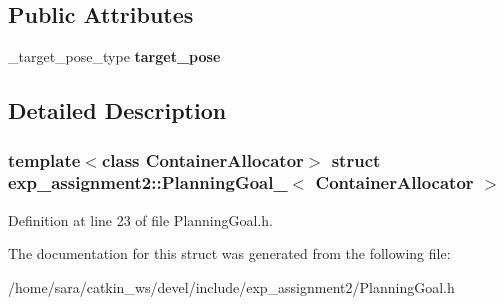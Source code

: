 \subsection*{Public Attributes}
\begin{DoxyCompactItemize}
\item 
\mbox{\label{structexp__assignment2_1_1PlanningGoal___a3468df99cf74378d36a10428537d37a0}} 
\+\_\+target\+\_\+pose\+\_\+type {\bfseries target\+\_\+pose}
\end{DoxyCompactItemize}


\subsection{Detailed Description}
\subsubsection*{template$<$class Container\+Allocator$>$\newline
struct exp\+\_\+assignment2\+::\+Planning\+Goal\+\_\+$<$ Container\+Allocator $>$}



Definition at line 23 of file Planning\+Goal.\+h.



The documentation for this struct was generated from the following file\+:\begin{DoxyCompactItemize}
\item 
/home/sara/catkin\+\_\+ws/devel/include/exp\+\_\+assignment2/Planning\+Goal.\+h\end{DoxyCompactItemize}
